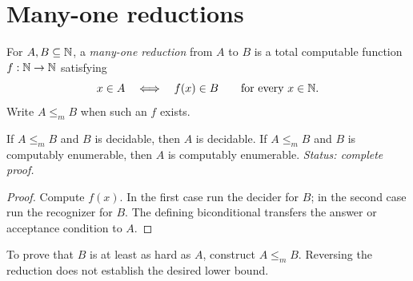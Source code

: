 \section{Many-one reductions}
\label{sec:universal-reductions-02}

\begin{definition}
For \(A,B\subseteq\mathbb{N}\), a \emph{many-one reduction} from \(A\) to \(B\) is a
total computable function \(f:\mathbb{N}\to\mathbb{N}\) satisfying
\[
  x\in A\quad\Longleftrightarrow\quad f(x)\in B
  \qquad\text{for every }x\in\mathbb{N}.
\]
Write \(A\leq_m B\) when such an \(f\) exists.
\end{definition}

\begin{lemma}
If \(A\leq_m B\) and \(B\) is decidable, then \(A\) is decidable.  If
\(A\leq_m B\) and \(B\) is computably enumerable, then \(A\) is computably
enumerable.
\textit{Status: complete proof.}
\end{lemma}

\begin{proof}
Compute \(f(x)\).  In the first case run the decider for \(B\); in the second
case run the recognizer for \(B\).  The defining biconditional transfers the
answer or acceptance condition to \(A\).
\end{proof}

\begin{warning}
To prove that \(B\) is at least as hard as \(A\), construct
\(A\leq_m B\).  Reversing the reduction does not establish the desired lower
bound.
\end{warning}

